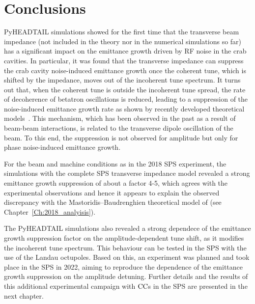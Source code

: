 

\section{Conclusions}\label{sec:Ch7_conclusions}
PyHEADTAIL simulations showed for the first time that the transverse beam impedance (not included in the theory nor in the numerical simulations so far) has a significant impact on the emittance growth driven by RF noise in the crab cavities. In particular, it was found that the transverse impedance can suppress the crab cavity noise-induced emittance growth once the coherent tune, which is shifted by the impedance, moves out of the incoherent tune spectrum. It turns out that, when the coherent tune is outside the incoherent tune spread, the rate of decoherence of betatron oscillations is reduced, leading to a suppression of the noise-induced emittance growth rate as shown by recently developed theoretical models~\cite{Buffat:2022dac, van_kamper_presentation_xavier_theory}. This mechanism, which has been observed in the past as a result of beam-beam interactions, is related to the transverse dipole oscillation of the beam. To this end, the suppression is not observed for amplitude but only for phase noise-induced emittance growth.

For the beam and machine conditions as in the 2018 SPS experiment, the simulations with the complete SPS transverse impedance model revealed a strong emittance growth suppression of about a factor 4-5, which agrees with the experimental observations and hence it appears to explain the observed discrepancy with the Mastoridis--Baudrenghien theoretical model of (see Chapter~\ref{Ch:2018_analyisis}). 

The PyHEADTAIL simulations also revealed a strong dependece of the emittance growth suppression factor on the amplitude-dependent tune shift, as it modifies the incoherent tune spectrum. This behaviour can be tested in the SPS with the use of the Landau octupoles. Based on this, an experiment was planned and took place in the SPS in 2022, aiming to reproduce the dependence of the emittance growth suppression on the amplitude detuning. Further details and the results of this additional experimental campaign with ${\mathrm{CC}}$s in the SPS are presented in the next chapter.




